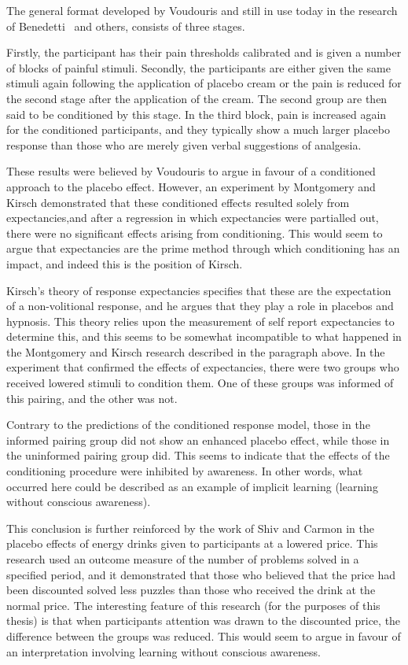 The general format developed by Voudouris and still in use today in the research of Benedetti~\cite{Benedetti2006c} and others, consists of three stages. 

Firstly, the participant has their pain thresholds calibrated and is given a number of blocks of painful stimuli. Secondly, the participants are either given the same stimuli again following the application of placebo cream or the pain is reduced for the second stage after the application of the cream. The second group are then said to be conditioned by this stage. In the third block, pain is increased again for the conditioned participants, and they typically show a much larger placebo response than those who are merely given verbal suggestions of analgesia.  

These results were believed by Voudouris to argue in favour of a conditioned approach to the placebo effect. However, an experiment by Montgomery and Kirsch \cite{Montgomery1997} demonstrated that these conditioned effects resulted solely from expectancies,and after a regression in which expectancies were partialled out, there were no significant effects arising from conditioning. This would seem to argue that expectancies are the prime method through which conditioning has an impact, and indeed this is the position of Kirsch. 

Kirsch's \cite{Kirsch1985,Kirsch1997} theory of response expectancies specifies that these are the expectation of a non-volitional response, and he argues that they play a role in placebos and hypnosis. This theory  relies upon the measurement of self report expectancies to determine this, and this seems  to be somewhat incompatible to what happened in the Montgomery and Kirsch research described in the paragraph above. In the experiment that confirmed the effects of expectancies, there were two groups who received lowered stimuli to condition them. One of these groups was informed of this pairing, and the other was not. 

Contrary to the predictions of the conditioned response model, those in the informed pairing group did not show an enhanced placebo effect, while those in the uninformed pairing group did. This seems to indicate that the effects of the conditioning procedure were inhibited by awareness. In other words, what occurred here could be described as an example of implicit learning (learning without conscious awareness).

This conclusion is further reinforced by the work of Shiv and Carmon \cite{Shiv2005a} in the placebo effects of energy drinks given to participants at a lowered price. This research used an outcome measure of the number of problems solved in a specified period, and it demonstrated that those who believed that the price had been discounted solved less puzzles than those who received the drink at the normal price. The interesting feature of this research (for the purposes of this thesis) is that when participants attention was drawn to the discounted price, the difference between the groups was reduced. This would seem to argue in favour of an interpretation involving learning without conscious awareness. 

